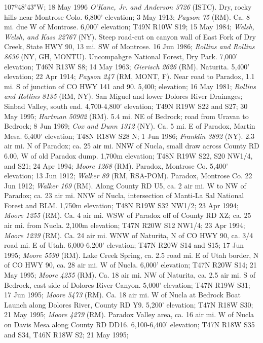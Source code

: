 107º48'43"W; 18 May 1996 \textit{O'Kane, Jr. and Anderson 3726} (ISTC).
Dry, rocky hills near Montrose Colo. 6,800' elevation; 3 May 1913;
\textit{Payson 75} (RM).
Ca. 8 mi. due W of Montrose. 6,000' elevation; T49N R10W S19; 15 May 1984;
\textit{Welsh, Welsh, and Kass 22767} (NY).
Steep road-cut on canyon wall of East Fork of Dry Creek, State HWY 90, 13 mi.
SW of Montrose. 16 Jun 1986; \textit{Rollins and Rollins 8636} (NY, GH, MONTU).
Uncompahgre National Forest, Dry Park. 7,000' elevation; T46N R13W S8;
14 May 1963; \textit{Gierisch 2626} (RM).
Naturita. 5,400' elevation; 22 Apr 1914; \textit{Payson 247} (RM, MONT, F).
Near road to Paradox, 1.1 mi. S of junction of CO HWY 141 and 90.
5,400; elevation; 16 May 1981; \textit{Rollins and Rollins 8135} (RM, NY).
San Miguel and lower Dolores River Drainages; Sinbad Valley, south end.
4,700-4,800' elevation; T49N R19W S22 and S27; 30 May 1995;
\textit{Hartman 50902} (RM).
5.4 mi. NE of Bedrock; road from Uravan to Bedrock; 8 Jun 1969;
\textit{Cox and Dunn 1312} (NY).
Ca. 5 mi. E of Paradox, Martin Mesa. 6,400' elevation; T48N R18W S28 N;
1 Jun 1986; \textit{Franklin 3892} (NY).
2.3 air mi. N of Paradox; ca. 25 air mi. NNW of Nucla, small draw across County
RD 6.00, W of old Paradox dump. 1,700m elevation; T48N R19W S22, S20 NW1/4,
and S21; 24 Apr 1994; \textit{Moore 1268} (RM).
Paradox, Montrose Co. 5,400' elevation; 13 Jun 1912;
\textit{Walker 89} (RM, RSA-POM).
Paradox, Montrose Co. 22 Jun 1912; \textit{Walker 169} (RM).
Along County RD U5, ca. 2 air mi. W to NW of Paradox; ca. 23 air mi. NNW of
Nucla, intersection of Manti-La Sal National Forest and BLM. 1,750m elevation;
T48N R19W S32 NW1/2; 23 Apr 1994; \textit{Moore 1255} (RM).
Ca. 4 air mi. WSW of Paradox off of County RD XZ; ca. 25 air mi. from Nucla.
2,100m elevation; T47N R20W S12 NW1/4; 23 Apr 1994; \textit{Moore 1239} (RM).
Ca. 24 air mi. WNW of Naturita, N of CO HWY 90, ca. 3/4 road mi. E of Utah.
6,000-6,200' elevation; T47N R20W S14 and S15; 17 Jun 1995;
\textit{Moore 5590} (RM).
Lake Creek Spring, ca. 2.5 road mi. E of Utah border, N of CO HWY 90, ca.
28 air mi. W of Nucla. 6,000' elevation; T47N R20W S14; 21 May 1995;
\textit{Moore 4255} (RM).
Ca. 18 air mi. NW of Naturita, ca. 2.5 air mi. S of Bedrock, east side of
Dolores River Canyon. 5,000' elevation; T47N R19W S31; 17 Jun 1995;
\textit{Moore 5473} (RM).
Ca. 18 air mi. W of Nucla at Bedrock Boat Launch along Dolores River, County
RD Y9. 5,200' elevation; T47N R18W S30; 21 May 1995; \textit{Moore 4279} (RM).
Paradox Valley area, ca. 16 air mi. W of Nucla on Davis Mesa along County RD
DD16. 6,100-6,400' elevation; T47N R18W S35 and S34, T46N R18W S2; 21 May 1995;
